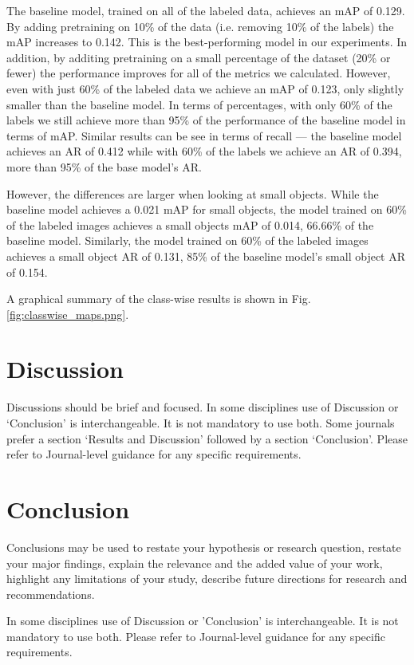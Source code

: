 \documentclass[conference]{IEEEtran}
\begin{document}
The baseline model, trained on all of the labeled data, achieves an mAP of 0.129. By adding pretraining on 10\% of the data (i.e. removing 10\% of the labels) the mAP increases to 0.142. This is the best-performing model in our experiments. In addition, by additing pretraining on a small percentage of the dataset (20\% or fewer) the performance improves for all of the metrics we calculated. However, even with just 60\% of the labeled data we achieve an mAP of 0.123, only slightly smaller than the baseline model. In terms of percentages, with only 60\% of the labels we still achieve more than 95\% of the performance of the baseline model in terms of mAP. Similar results can be see in terms of recall — the baseline model achieves an AR of 0.412 while with 60\% of the labels we achieve an AR of 0.394, more than 95\% of the base model's AR.

However, the differences are larger when looking at small objects. While the baseline model achieves a 0.021 mAP for small objects, the model trained on 60\% of the labeled images achieves a small objects mAP of 0.014, 66.66\% of the baseline model. Similarly, the model trained on 60\% of the labeled images achieves a small object AR of 0.131, 85\% of the baseline model's small object AR of 0.154.

A graphical summary of the class-wise results is shown in Fig. \ref{fig:classwise_maps.png}.

\section{Discussion}\label{sec12}

Discussions should be brief and focused. In some disciplines use of Discussion or `Conclusion' is interchangeable. It is not mandatory to use both. Some journals prefer a section `Results and Discussion' followed by a section `Conclusion'. Please refer to Journal-level guidance for any specific requirements. 

\section{Conclusion}\label{sec13}

Conclusions may be used to restate your hypothesis or research question, restate your major findings, explain the relevance and the added value of your work, highlight any limitations of your study, describe future directions for research and recommendations. 

In some disciplines use of Discussion or 'Conclusion' is interchangeable. It is not mandatory to use both. Please refer to Journal-level guidance for any specific requirements. 


\end{document}
